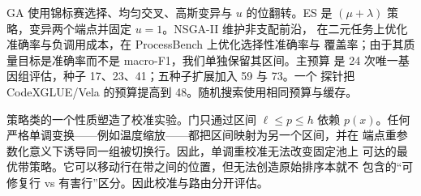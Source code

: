 GA 使用锦标赛选择、均匀交叉、高斯变异与 $u$ 的位翻转。ES 是
$(\mu+\lambda)$ 策略，变异两个端点并固定 $u=1$。NSGA-II 维护非支配前沿，
在二元任务上优化准确率与负调用成本，在 ProcessBench 上优化选择性准确率与
覆盖率；由于其质量目标是准确率而不是 macro-F1，我们单独保留其区间。主预算
是 24 次唯一基因组评估，种子 17、23、41；五种子扩展加入 59 与 73。一个
探针把 CodeXGLUE/Vela 的预算提高到 48。随机搜索使用相同预算与缓存。

策略类的一个性质塑造了校准实验。门只通过区间 $\ell\le p\le h$ 依赖
$p(x)$。任何严格单调变换——例如温度缩放——都把区间映射为另一个区间，并在
端点重参数化意义下诱导同一组被切换行。因此，单调重校准无法改变固定池上
可达的最优带策略。它可以移动行在带之间的位置，但无法创造原始排序本就不
包含的“可修复行 vs 有害行”区分。因此校准与路由分开评估。
